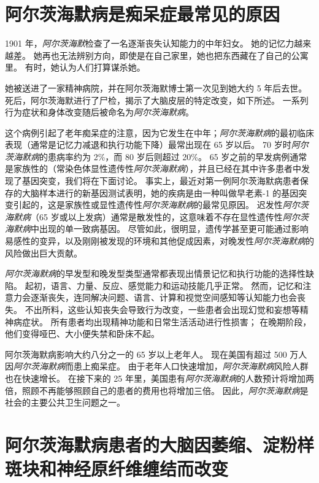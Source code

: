\section{阿尔茨海默病是痴呆症最常见的原因}

1901 年，\textit{阿尔茨海默}检查了一名逐渐丧失认知能力的中年妇女。
她的记忆力越来越差。
她再也无法辨别方向，即使是在自己家里，她也把东西藏在了自己的公寓里。
有时，她认为人们打算谋杀她。


她被送进了一家精神病院，并在阿尔茨海默博士第一次见到她大约 5 年后去世。
死后，阿尔茨海默进行了尸检，揭示了大脑皮层的特定改变，如下所述。
一系列行为症状和身体改变随后被命名为\textit{阿尔茨海默病}。


这个病例引起了老年痴呆症的注意，因为它发生在中年；\textit{阿尔茨海默病}的最初临床表现（通常是记忆力减退和执行功能下降）最常出现在 65 岁以后。
70 岁时\textit{阿尔茨海默病}的患病率约为 2\%，而 80 岁后则超过 20\%。
65 岁之前的早发病例通常是家族性的（常染色体显性遗传性\textit{阿尔茨海默病}），并且已经在其中许多患者中发现了基因突变，我们将在下面讨论。
事实上，最近对第一例阿尔茨海默病患者保存的大脑样本进行的新基因测试表明，她的疾病是由一种叫做早老素-1 的基因突变引起的，这是家族性或显性遗传性\textit{阿尔茨海默病}的最常见原因。
迟发性\textit{阿尔茨海默病}（65 岁或以上发病）通常是散发性的，这意味着不存在显性遗传性\textit{阿尔茨海默病}中出现的单一致病基因。
尽管如此，很明显，遗传学甚至更可能通过影响易感性的变异，以及刚刚被发现的环境和其他促成因素，对晚发性\textit{阿尔茨海默病}的风险做出巨大贡献。


\textit{阿尔茨海默病}的早发型和晚发型类型通常都表现出情景记忆和执行功能的选择性缺陷。
起初，语言、力量、反应、感觉能力和运动技能几乎正常。
然而，记忆和注意力会逐渐丧失，连同解决问题、语言、计算和视觉空间感知等认知能力也会丧失。
不出所料，这些认知丧失会导致行为改变，一些患者会出现幻觉和妄想等精神病症状。
所有患者均出现精神功能和日常生活活动进行性损害；
在晚期阶段，他们变得哑巴、大小便失禁和卧床不起。


阿尔茨海默病影响大约八分之一的 65 岁以上老年人。 现在美国有超过 500 万人因\textit{阿尔茨海默病}而患上痴呆症。
由于老年人口快速增加，\textit{阿尔茨海默病}风险人群也在快速增长。
在接下来的 25 年里，美国患有\textit{阿尔茨海默病}的人数预计将增加两倍，照顾不再能够照顾自己的患者的费用也将增加三倍。
因此，\textit{阿尔茨海默病}是社会的主要公共卫生问题之一。



\section{阿尔茨海默病患者的大脑因萎缩、淀粉样斑块和神经原纤维缠结而改变}

